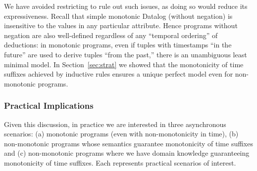 We have avoided restricting \lang to rule out such issues, as doing so
would reduce its expressiveness.  Recall that simple monotonic Datalog (without negation) is insensitive to the values in any particular attribute.  Hence \lang programs without negation are also well-defined regardless of any ``temporal ordering'' of deductions: in monotonic programs, even if tuples with timestamps ``in the future'' are used to derive tuples ``from the past,'' there is an unambiguous least minimal model.
In Section~\ref{sec:strat} we showed that the monotonicity of time suffixes achieved by inductive rules
ensures a unique perfect model even for non-monotonic \slang programs.


%

% 
\subsubsection{Practical Implications}
Given this discussion, in practice we are interested in three asynchronous scenarios: (a) monotonic programs (even with non-monotonicity in time), (b) non-monotonic programs whose semantics guarantee monotonicity of time suffixes  and (c) non-monotonic programs where we have domain knowledge guaranteeing monotonicity of time suffixes.  Each represents practical scenarios of interest.

